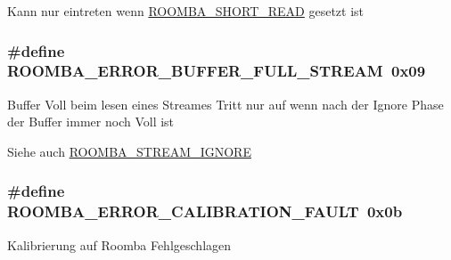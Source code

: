 Kann nur eintreten wenn \hyperlink{group__reader_ga6c7a085dd8b07086302a3522eacb1d7b}{R\-O\-O\-M\-B\-A\-\_\-\-S\-H\-O\-R\-T\-\_\-\-R\-E\-A\-D} gesetzt ist \hypertarget{group__roomba__error_gafb6db822e9e4a47ec7a987c717830202}{
\subsubsection[{R\-O\-O\-M\-B\-A\-\_\-\-E\-R\-R\-O\-R\-\_\-\-B\-U\-F\-F\-E\-R\-\_\-\-F\-U\-L\-L\-\_\-\-S\-T\-R\-E\-A\-M}]{\setlength{\rightskip}{0pt plus 5cm}\#define R\-O\-O\-M\-B\-A\-\_\-\-E\-R\-R\-O\-R\-\_\-\-B\-U\-F\-F\-E\-R\-\_\-\-F\-U\-L\-L\-\_\-\-S\-T\-R\-E\-A\-M~0x09}}\label{group__roomba__error_gafb6db822e9e4a47ec7a987c717830202}
Buffer Voll beim lesen eines Streames Tritt nur auf wenn nach der Ignore Phase der Buffer immer noch Voll ist \begin{DoxySeeAlso}{Siehe auch}
\hyperlink{group__reader_ga2079001845af1fd6a4e1155bb27519c6}{R\-O\-O\-M\-B\-A\-\_\-\-S\-T\-R\-E\-A\-M\-\_\-\-I\-G\-N\-O\-R\-E} 
\end{DoxySeeAlso}
\hypertarget{group__roomba__error_ga225b79c08707c02fe85f6ab72a339270}{
\subsubsection[{R\-O\-O\-M\-B\-A\-\_\-\-E\-R\-R\-O\-R\-\_\-\-C\-A\-L\-I\-B\-R\-A\-T\-I\-O\-N\-\_\-\-F\-A\-U\-L\-T}]{\setlength{\rightskip}{0pt plus 5cm}\#define R\-O\-O\-M\-B\-A\-\_\-\-E\-R\-R\-O\-R\-\_\-\-C\-A\-L\-I\-B\-R\-A\-T\-I\-O\-N\-\_\-\-F\-A\-U\-L\-T~0x0b}}\label{group__roomba__error_ga225b79c08707c02fe85f6ab72a339270}
Kalibrierung auf Roomba Fehlgeschlagen

